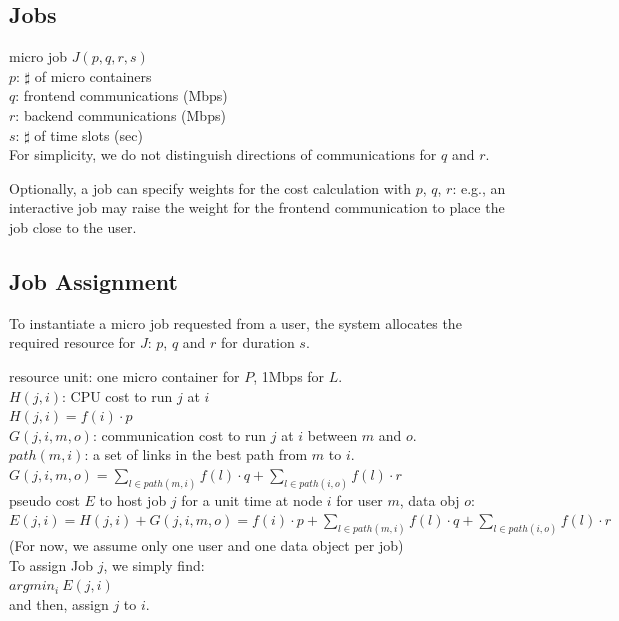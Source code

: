 \subsection{Jobs}

micro job $J(p, q, r, s)$	\\
$p$: $\sharp$ of micro containers	\\
$q$: frontend communications (Mbps)	\\
$r$: backend communications (Mbps)	\\
$s$: $\sharp$ of time slots (sec)	\\

For simplicity, we do not distinguish directions of communications for $q$ and $r$.

Optionally, a job can specify weights for the cost calculation with $p$, $q$, $r$:
e.g., an interactive job may raise the weight for the frontend
communication to place the job close to the user.

\subsection{Job Assignment}

To instantiate a micro job requested from a user, the system allocates
the required resource for $J$: $p$, $q$ and $r$ for duration $s$.



resource unit: one micro container for $P$, 1Mbps for $L$. \\
$H(j, i)$: CPU cost to run $j$ at $i$ \\
\( H(j, i) = f(i) \cdot p \)	\\
$G(j, i, m, o)$: communication cost to run $j$ at $i$ between $m$ and $o$. \\
$path(m,i)$: a set of links in the best path from $m$ to $i$. \\
\( G(j, i, m, o) = \sum_{l \in path(m,i)} f(l) \cdot q + \sum_{l \in path(i,o)} f(l) \cdot r \) \\
pseudo cost $E$ to host job $j$ for a unit time at node $i$ for user $m$, data obj $o$: \\
\( E(j, i)  =  H(j,i) + G(j,i,m,o) =  f(i) \cdot p + \sum_{l \in path(m,i)} f(l) \cdot q + \sum_{l \in path(i,o)} f(l) \cdot r \) \\
(For now, we assume only one user and one data object per job) \\
To assign Job $j$, we simply find: \\
\(  argmin_{i} \: E(j, i)   \)  \\
and then, assign $j$ to $i$. \\

